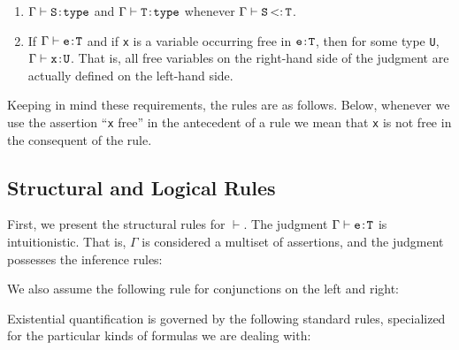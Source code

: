 \documentclass[preprint,nocopyrightspace,9pt]{sigplanconf}
\begin{document}
{\begin{enumerate}
\item
    $\Gamma \vdash {\tt S} \ty {\tt type}$ and
    $\Gamma \vdash {\tt T} \ty {\tt type}$ whenever
      $\Gamma \vdash {\tt S} \subtype {\tt T}$.

\item
If 
      $\Gamma \vdash {\tt e} \ty {\tt T}$ and if {\tt x}
is a variable occurring free in ${\tt e} \ty {\tt T}$, then for some
      type {\tt U},
      $\Gamma \vdash {\tt x} \ty {\tt U}$.
That is, all free variables on the right-hand
      side of the judgment are actually defined on the left-hand side.
\end{enumerate}


Keeping in mind these requirements, the rules are as follows. Below,
whenever we use the assertion ``{\tt x} free'' in the antecedent of
a rule we mean
that {\tt x} is not free in the consequent of the rule.


\subsection{
      Structural and Logical Rules
}


First, we present the structural rules for $\vdash$. The
judgment
$\Gamma\vdash {\tt e} \ty {\tt T}$ is
intuitionistic. That is, $\Gamma$ is considered a multiset of assertions, and
the judgment possesses the inference rules:






We also assume the following rule for conjunctions on the left and right:






Existential quantification is governed by the following standard rules,
specialized for the particular kinds of formulas we are dealing with:







}
\end{document}
